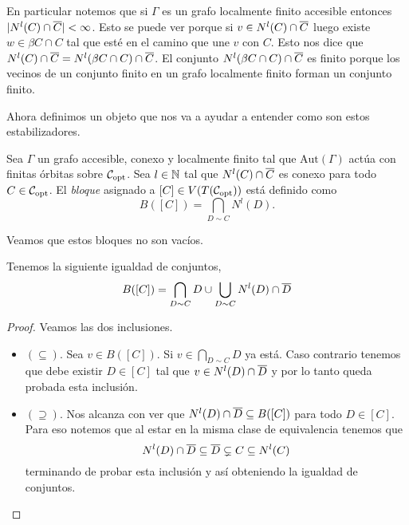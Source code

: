 \documentclass[tesis.tex]{subfiles}
\newcommand{\aut}{\text{Aut}}
\begin{document}
\begin{obs}
	En particular notemos que si $\Gamma$ es un grafo localmente finito accesible entonces  $|N^l(C) \cap \overline C|<\infty$. 
	Esto se puede ver porque si $v \in N^l(C) \cap \overline C$ luego existe $w \in \beta C \cap C$ tal que esté en el camino que une $v$ con $C$.
	Esto nos dice que $N^l(C) \cap \overline C = N^l(\beta C  \cap C) \cap \overline C$. 
	El conjunto $N^l(\beta C  \cap C) \cap \overline C$ es finito porque los vecinos de un conjunto finito en un grafo localmente finito forman un conjunto finito.
\end{obs}

Ahora definimos un objeto que nos va a ayudar a entender como son estos estabilizadores.

\begin{deff}
	Sea $\Gamma$ un grafo accesible, conexo y localmente finito
	tal que $\aut(\Gamma)$ actúa con finitas órbitas sobre ${\cal C}_{\text{opt}}$.
	Sea $l \in \mathbb{N}$ tal que $N^l(C) \cap \overline C$ es conexo para todo $C \in {\cal C}_{\text{opt}}$.
	El \emph{bloque} asignado a $[C] \in V(T({\cal C}_{\text{opt}}))$ está definido como
	\[
		B([C]) = \bigcap_{D \sim C} N^l (D).
	\]	
\end{deff}



Veamos que estos bloques no son vacíos.

\begin{lema}\label{lema_bloques_def_equiv}
	Tenemos la siguiente igualdad de conjuntos,
	\[
		B([C]) = \bigcap_{D \sim C} D \cup \bigcup_{D \sim C} N^l(D) \cap \overline D
	\]
\end{lema}

\begin{proof}
	Veamos las dos inclusiones.
	
	\begin{itemize}
		\item \textbf{$(\subseteq)$}. 
		Sea $v \in B([C])$. 
		Si $v \in \bigcap_{D \sim C} D$ ya está. 
		Caso contrario tenemos que debe existir $D \in [C]$ tal que $v \in N^l(D) \cap \overline D$ y por lo tanto queda probada esta inclusión.
		\item \textbf{$(\supseteq)$}. 
		Nos alcanza con ver que $ N^l(D) \cap \overline D \subseteq B([C])$ para todo $D \in [C]$.
		Para eso notemos que al estar en la misma clase de equivalencia tenemos que 
		\[
			N^l(D) \cap \overline D \subseteq \overline D \subsetneq C \subseteq N^l(C)
		\]
		terminando de probar esta inclusión y así obteniendo la igualdad de conjuntos.
	\end{itemize}
\end{proof}
\end{document}
